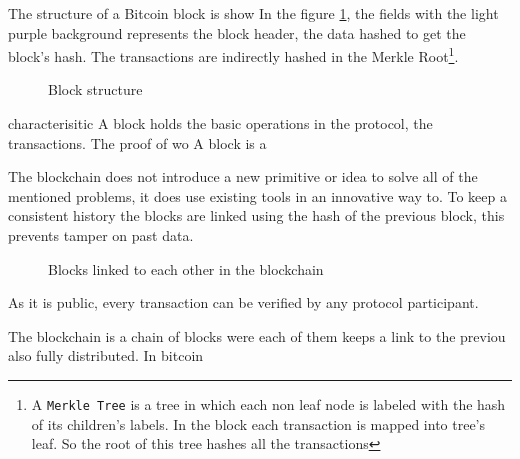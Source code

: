 The structure of a Bitcoin block is show In the figure \ref{fig:block_pow}, the
  fields with the light purple background represents the block header, the data
  hashed to get the block's hash. The transactions are indirectly hashed in the
  Merkle Root\footnote{A \texttt{Merkle Tree} is a tree in which each non leaf
  node is labeled with the hash of its children's labels. In the block each
  transaction is mapped into tree's leaf. So the root of this tree hashes all
  the transactions}.

\begin{figure}
	\centering
	
	\caption{Block structure}
	\label{fig:block_pow}
\end{figure}

  characterisitic
  A block holds the basic operations in the protocol, the transactions. The
  proof of wo
A block is a

The blockchain does not introduce a new primitive or idea to solve all of the
  mentioned problems, it does use existing tools in an innovative way to.
To keep a consistent history the blocks are linked using the hash of the
  previous block, this prevents tamper on past data.
\begin{figure}
	\centering
	\def\svgwidth{\columnwidth}
	
	\caption{Blocks linked to each other in the blockchain}
	\label{fig:block_links}
\end{figure}



As it is public, every transaction can be verified by any protocol participant.


  The blockchain is  a chain of blocks were each of them keeps a link
to the previou
  also fully distributed. In bitcoin


